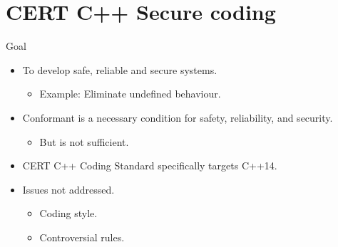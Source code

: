 \section{CERT C++ Secure coding}

\begin{frame}[t]{Goal}
\begin{itemize}
  \item To develop safe, reliable and secure systems.
    \begin{itemize}
      \item Example: Eliminate undefined behaviour.
    \end{itemize}

  \vfill
  \item Conformant is a necessary condition for safety, reliability, and security.
    \begin{itemize}
      \item But is not sufficient.
    \end{itemize}

  \vfill
  \item CERT C++ Coding Standard specifically targets C++14.

  \vfill
  \item Issues not addressed.
    \begin{itemize}
      \item Coding style.
      \item Controversial rules.
    \end{itemize}
\end{itemize}
\end{frame}

